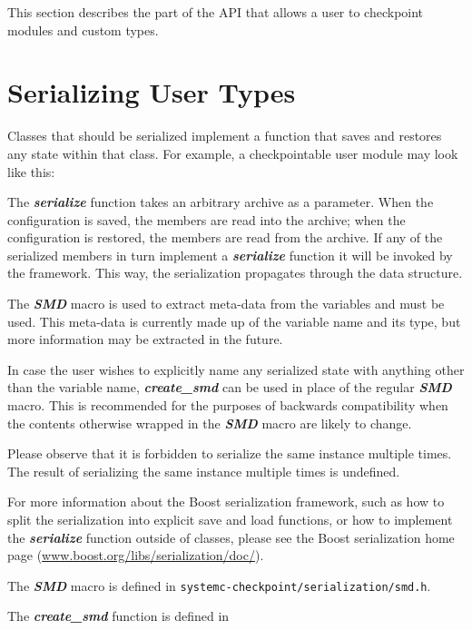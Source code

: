 \documentclass[oneside]{memoir}
\begin{document}
This section describes the part of the API that allows a user to checkpoint modules and custom types.

\section{Serializing User Types}
\label{user-types}

Classes that should be serialized implement a function that saves and restores any state within that class.
For example, a checkpointable user module may look like this:



The \textit{\textbf{serialize}} function takes an arbitrary archive as a parameter.
When the configuration is saved, the members are read into the archive; when the configuration is restored, the members are read from the archive.
If any of the serialized members in turn implement a \textit{\textbf{serialize}} function it will be invoked by the framework.
This way, the serialization propagates through the data structure.

The \textit{\textbf{SMD}} macro is used to extract meta-data from the variables and must be used.
This meta-data is currently made up of the variable name and its type, but more information may be extracted in the future.

In case the user wishes to explicitly name any serialized state with anything other than the variable name, \textit{\textbf{create\_smd}} can be used in place of the regular \textit{\textbf{SMD}} macro.
This is recommended for the purposes of backwards compatibility when the contents otherwise wrapped in the \textit{\textbf{SMD}} macro are likely to change.

Please observe that it is forbidden to serialize the same instance multiple times.
The result of serializing the same instance multiple times is undefined.

For more information about the Boost serialization framework, such as how to split the serialization into explicit save and load functions, or how to implement the \textit{\textbf{serialize}} function outside of classes, please see the Boost serialization home page (\url{www.boost.org/libs/serialization/doc/}).

The \textit{\textbf{SMD}} macro is defined in \texttt{systemc-checkpoint/serialization/smd.h}.

The \textit{\textbf{create\_smd}} function is defined in
\end{document}
